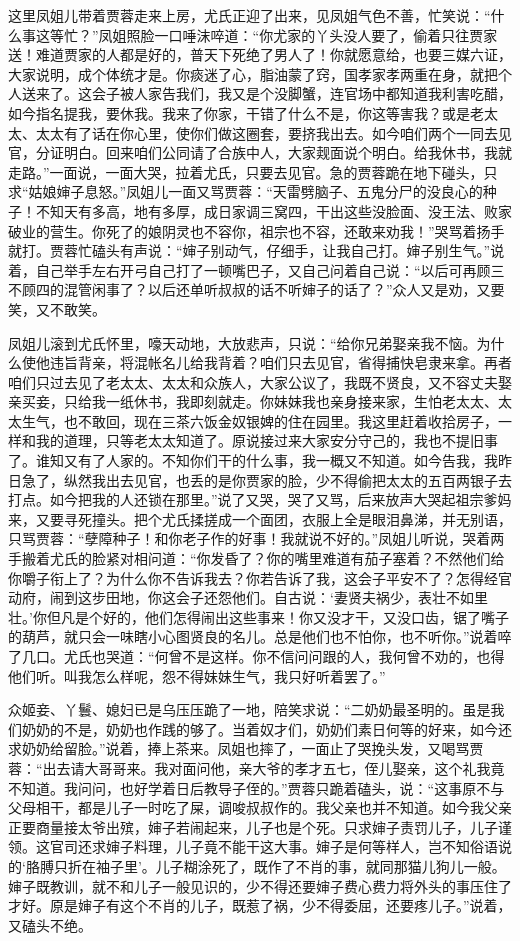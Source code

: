 这里凤姐儿带着贾蓉走来上房，尤氏正迎了出来，见凤姐气色不善，忙笑说：“什么事这等忙？”凤姐照脸一口唾沫啐道：“你尤家的丫头没人要了，偷着只往贾家送！难道贾家的人都是好的，普天下死绝了男人了！你就愿意给，也要三媒六证，大家说明，成个体统才是。你痰迷了心，脂油蒙了窍，国孝家孝两重在身，就把个人送来了。这会子被人家告我们，我又是个没脚蟹，连官场中都知道我利害吃醋，如今指名提我，要休我。我来了你家，干错了什么不是，你这等害我？或是老太太、太太有了话在你心里，使你们做这圈套，要挤我出去。如今咱们两个一同去见官，分证明白。回来咱们公同请了合族中人，大家觌面说个明白。给我休书，我就走路。”一面说，一面大哭，拉着尤氏，只要去见官。急的贾蓉跪在地下碰头，只求“姑娘婶子息怒。”凤姐儿一面又骂贾蓉：“天雷劈脑子、五鬼分尸的没良心的种子！不知天有多高，地有多厚，成日家调三窝四，干出这些没脸面、没王法、败家破业的营生。你死了的娘阴灵也不容你，祖宗也不容，还敢来劝我！”哭骂着扬手就打。贾蓉忙磕头有声说：“婶子别动气，仔细手，让我自己打。婶子别生气。”说着，自己举手左右开弓自己打了一顿嘴巴子，又自己问着自己说：“以后可再顾三不顾四的混管闲事了？以后还单听叔叔的话不听婶子的话了？”众人又是劝，又要笑，又不敢笑。

凤姐儿滚到尤氏怀里，嚎天动地，大放悲声，只说：“给你兄弟娶亲我不恼。为什么使他违旨背亲，将混帐名儿给我背着？咱们只去见官，省得捕快皂隶来拿。再者咱们只过去见了老太太、太太和众族人，大家公议了，我既不贤良，又不容丈夫娶亲买妾，只给我一纸休书，我即刻就走。你妹妹我也亲身接来家，生怕老太太、太太生气，也不敢回，现在三茶六饭金奴银婢的住在园里。我这里赶着收拾房子，一样和我的道理，只等老太太知道了。原说接过来大家安分守己的，我也不提旧事了。谁知又有了人家的。不知你们干的什么事，我一概又不知道。如今告我，我昨日急了，纵然我出去见官，也丢的是你贾家的脸，少不得偷把太太的五百两银子去打点。如今把我的人还锁在那里。”说了又哭，哭了又骂，后来放声大哭起祖宗爹妈来，又要寻死撞头。把个尤氏揉搓成一个面团，衣服上全是眼泪鼻涕，并无别语，只骂贾蓉：“孽障种子！和你老子作的好事！我就说不好的。”凤姐儿听说，哭着两手搬着尤氏的脸紧对相问道：“你发昏了？你的嘴里难道有茄子塞着？不然他们给你嚼子衔上了？为什么你不告诉我去？你若告诉了我，这会子平安不了？怎得经官动府，闹到这步田地，你这会子还怨他们。自古说：‘妻贤夫祸少，表壮不如里壮。’你但凡是个好的，他们怎得闹出这些事来！你又没才干，又没口齿，锯了嘴子的葫芦，就只会一味瞎小心图贤良的名儿。总是他们也不怕你，也不听你。”说着啐了几口。尤氏也哭道：“何曾不是这样。你不信问问跟的人，我何曾不劝的，也得他们听。叫我怎么样呢，怨不得妹妹生气，我只好听着罢了。”

众姬妾、丫鬟、媳妇已是乌压压跪了一地，陪笑求说：“二奶奶最圣明的。虽是我们奶奶的不是，奶奶也作践的够了。当着奴才们，奶奶们素日何等的好来，如今还求奶奶给留脸。”说着，捧上茶来。凤姐也摔了，一面止了哭挽头发，又喝骂贾蓉：“出去请大哥哥来。我对面问他，亲大爷的孝才五七，侄儿娶亲，这个礼我竟不知道。我问问，也好学着日后教导子侄的。”贾蓉只跪着磕头，说：“这事原不与父母相干，都是儿子一时吃了屎，调唆叔叔作的。我父亲也并不知道。如今我父亲正要商量接太爷出殡，婶子若闹起来，儿子也是个死。只求婶子责罚儿子，儿子谨领。这官司还求婶子料理，儿子竟不能干这大事。婶子是何等样人，岂不知俗语说的‘胳膊只折在袖子里’。儿子糊涂死了，既作了不肖的事，就同那猫儿狗儿一般。婶子既教训，就不和儿子一般见识的，少不得还要婶子费心费力将外头的事压住了才好。原是婶子有这个不肖的儿子，既惹了祸，少不得委屈，还要疼儿子。”说着，又磕头不绝。

